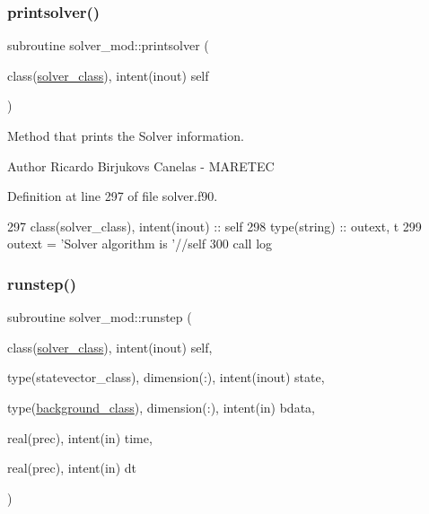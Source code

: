 \subsubsection{\texorpdfstring{printsolver()}{printsolver()}}
{\footnotesize\ttfamily subroutine solver\+\_\+mod\+::printsolver (\begin{DoxyParamCaption}\item[{class(\mbox{\hyperlink{structsolver__mod_1_1solver__class}{solver\+\_\+class}}), intent(inout)}]{self }\end{DoxyParamCaption})\hspace{0.3cm}{\ttfamily [private]}}



Method that prints the Solver information. 

\begin{DoxyAuthor}{Author}
Ricardo Birjukovs Canelas -\/ M\+A\+R\+E\+T\+EC 
\end{DoxyAuthor}


Definition at line 297 of file solver.\+f90.


\begin{DoxyCode}
297     \textcolor{keywordtype}{class}(solver\_class), \textcolor{keywordtype}{intent(inout)} :: self
298     \textcolor{keywordtype}{type}(string) :: outext, t
299     outext = \textcolor{stringliteral}{'Solver algorithm is '}//self%
300     \textcolor{keyword}{call }log%
\end{DoxyCode}
\mbox{\label{namespacesolver__mod_a75c5c8b01ae4ae193ff03dbe7e5fc6af}} 
\subsubsection{\texorpdfstring{runstep()}{runstep()}}
{\footnotesize\ttfamily subroutine solver\+\_\+mod\+::runstep (\begin{DoxyParamCaption}\item[{class(\mbox{\hyperlink{structsolver__mod_1_1solver__class}{solver\+\_\+class}}), intent(inout)}]{self,  }\item[{type(statevector\+\_\+class), dimension(\+:), intent(inout)}]{state,  }\item[{type(\mbox{\hyperlink{structbackground__mod_1_1background__class}{background\+\_\+class}}), dimension(\+:), intent(in)}]{bdata,  }\item[{real(prec), intent(in)}]{time,  }\item[{real(prec), intent(in)}]{dt }\end{DoxyParamCaption})\hspace{0.3cm}{\ttfamily [private]}}




